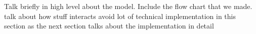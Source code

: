Talk briefly in high level about the model.
Include the flow chart that we made.
talk about how stuff interacts
avoid lot of technical implementation in this section as the next section talks about the implementation in detail